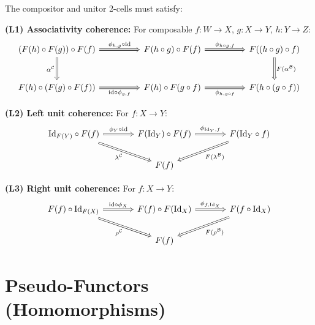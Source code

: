\begin{definition}
\label{def:lax-coherence}
The compositor and unitor 2-cells must satisfy:

\textbf{(L1) Associativity coherence:} For composable $f : W \to X$, $g : X \to Y$, $h : Y \to Z$:
\[
\begin{tikzcd}[column sep=huge, row sep=large]
  (F(h) \circ F(g)) \circ F(f)
    \arrow[r, Rightarrow, "\phi_{h,g} \circ \mathrm{id}"]
    \arrow[d, Rightarrow, "\alpha^{\mathcal{C}}"']
  &
  F(h \circ g) \circ F(f)
    \arrow[r, Rightarrow, "\phi_{h \circ g, f}"]
  &
  F((h \circ g) \circ f)
    \arrow[d, Rightarrow, "F(\alpha^{\mathcal{B}})"]
  \\
  F(h) \circ (F(g) \circ F(f))
    \arrow[r, Rightarrow, "\mathrm{id} \circ \phi_{g,f}"']
  &
  F(h) \circ F(g \circ f)
    \arrow[r, Rightarrow, "\phi_{h, g \circ f}"']
  &
  F(h \circ (g \circ f))
\end{tikzcd}
\]

\textbf{(L2) Left unit coherence:} For $f : X \to Y$:
\[
\begin{tikzcd}[column sep=large]
  \mathrm{Id}_{F(Y)} \circ F(f)
    \arrow[r, Rightarrow, "\phi_Y \circ \mathrm{id}"]
    \arrow[dr, Rightarrow, "\lambda^{\mathcal{C}}"']
  &
  F(\mathrm{Id}_Y) \circ F(f)
    \arrow[r, Rightarrow, "\phi_{\mathrm{Id}_Y, f}"]
  &
  F(\mathrm{Id}_Y \circ f)
    \arrow[dl, Rightarrow, "F(\lambda^{\mathcal{B}})"]
  \\
  & F(f) &
\end{tikzcd}
\]

\textbf{(L3) Right unit coherence:} For $f : X \to Y$:
\[
\begin{tikzcd}[column sep=large]
  F(f) \circ \mathrm{Id}_{F(X)}
    \arrow[r, Rightarrow, "\mathrm{id} \circ \phi_X"]
    \arrow[dr, Rightarrow, "\rho^{\mathcal{C}}"']
  &
  F(f) \circ F(\mathrm{Id}_X)
    \arrow[r, Rightarrow, "\phi_{f, \mathrm{Id}_X}"]
  &
  F(f \circ \mathrm{Id}_X)
    \arrow[dl, Rightarrow, "F(\rho^{\mathcal{B}})"]
  \\
  & F(f) &
\end{tikzcd}
\]
\end{definition}

\section{Pseudo-Functors (Homomorphisms)}
\label{sec:pseudo-functors}

